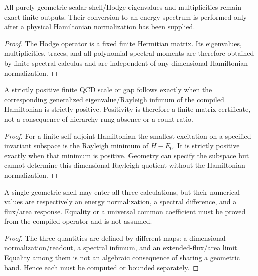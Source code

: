 \documentclass[12pt,a4paper]{article}
\begin{document}
\begin{corollary}
\label{p10:cor:exact-minimal-scalar-shell-moments}
All purely geometric scalar-shell/Hodge eigenvalues and multiplicities remain exact finite outputs.  Their conversion to an energy spectrum is performed only after a physical Hamiltonian normalization has been supplied.
\end{corollary}
\begin{proof}
The Hodge operator is a fixed finite Hermitian matrix.  Its eigenvalues, multiplicities, traces, and all polynomial spectral moments are therefore obtained by finite spectral calculus and are independent of any dimensional Hamiltonian normalization.
\end{proof}

\begin{theorem}
\label{p10:thm:positive-native-nonperturbative-scale-floor}
A strictly positive finite QCD scale or gap follows exactly when the corresponding generalized eigenvalue/Rayleigh infimum of the compiled Hamiltonian is strictly positive.  Positivity is therefore a finite matrix certificate, not a consequence of hierarchy-rung absence or a count ratio.
\end{theorem}
\begin{proof}
For a finite self-adjoint Hamiltonian the smallest excitation on a specified invariant subspace is the Rayleigh minimum of $H-E_0$.  It is strictly positive exactly when that minimum is positive.  Geometry can specify the subspace but cannot determine this dimensional Rayleigh quotient without the Hamiltonian normalization.
\end{proof}

\begin{corollary}
\label{p10:cor:single-shell-origin-scale-gap-confinement}
A single geometric shell may enter all three calculations, but their numerical values are respectively an energy normalization, a spectral difference, and a flux/area response.  Equality or a universal common coefficient must be proved from the compiled operator and is not assumed.
\end{corollary}
\begin{proof}
The three quantities are defined by different maps: a dimensional normalization/readout, a spectral infimum, and an extended-flux/area limit.  Equality among them is not an algebraic consequence of sharing a geometric band.  Hence each must be computed or bounded separately.
\end{proof}
\end{document}
